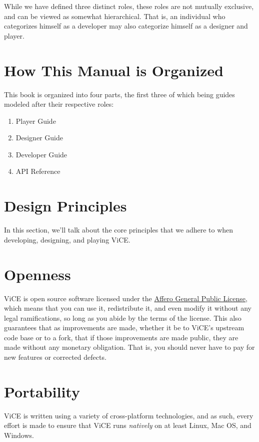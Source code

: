 \documentclass[letterpaper,10pt,english]{sphinxmanual}
\begin{document}
While we have defined three distinct roles, these roles are not mutually
exclusive, and can be viewed as somewhat hierarchical. That is, an individual
who categorizes himself as a developer may also categorize himself as a
designer and player.


\section{How This Manual is Organized}
\label{preface:how-this-manual-is-organized}
This book is organized into four parts, the first three of which being guides
modeled after their respective roles:
\begin{enumerate}
\item {} 
Player Guide

\item {} 
Designer Guide

\item {} 
Developer Guide

\item {} 
API Reference

\end{enumerate}


\section{Design Principles}
\label{preface:design-principles}
In this section, we'll talk about the core principles that we adhere to when
developing, designing, and playing ViCE.


\section{Openness}
\label{preface:openness}
ViCE is open source software licensed under
the \href{http://www.gnu.org/licenses/agpl-3.0.html}{Affero General Public License},
which means that you can use it, redistribute it, and even modify it without
any legal ramifications, so long as you abide by the terms of the license.
This also guarantees that as improvements are made, whether it be to
ViCE's upstream code base or to a fork, that
if those improvements are made public, they are made without any monetary
obligation. That is, you should never have to pay for new features or corrected defects.


\section{Portability}
\label{preface:portability}
ViCE is written using a variety of
cross-platform technologies, and as such, every effort is made to ensure that
ViCE runs \emph{natively} on at least Linux,
Mac OS, and Windows.
\end{document}
